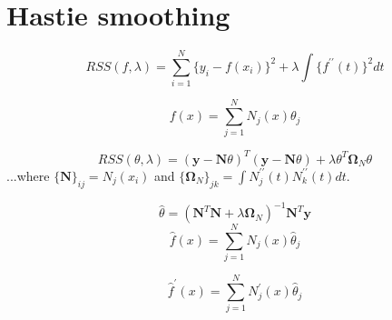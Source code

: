 \documentclass {article}
\begin{document}
\section{Hastie smoothing}
\begin{equation}
	RSS(f,\lambda) = \sum\limits_{i=1}^N \lbrace y_i-f(x_i)\rbrace^2 + \lambda \int\lbrace f^{\prime\prime}(t)\rbrace^2 dt
\end{equation}

\begin{equation}
	f(x) = \sum\limits_{j=1}^N N_j(x)\theta_j
\end{equation}

\begin{equation}
	RSS(\theta,\lambda) = (\mathbf{y} - \mathbf{N}\theta)^T(\mathbf{y} - \mathbf{N}\theta) + \lambda\theta^T\mathbf{\Omega}_N\theta
\end{equation}
...where \(\lbrace\mathbf{N}\rbrace_{ij} = N_j(x_i)\) and \(\lbrace\mathbf{\Omega}_N\rbrace_{jk} = \int N_j^{\prime\prime}(t)N_k^{\prime\prime}(t)dt\).

\begin{equation}
\hat{\theta} = (\mathbf{N}^T\mathbf{N} + \lambda\mathbf{\Omega}_N)^{-1}\mathbf{N}^T\mathbf{y}
\end{equation}
\begin{equation}
\hat{f}(x) = \sum\limits_{j=1}^N N_j(x)\hat{\theta}_j
\end{equation}

\begin{equation}
\hat{f}^\prime(x) = \sum\limits_{j=1}^N N_j^\prime(x)\hat{\theta}_j
\end{equation}
\end{document}
